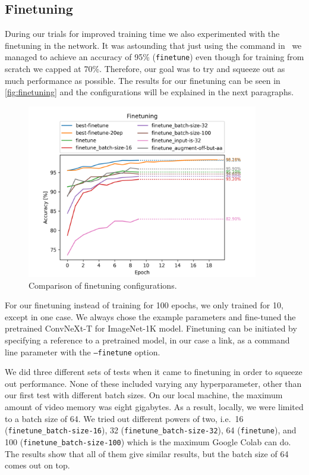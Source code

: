 \documentclass{article}
\begin{document}
\subsection{Finetuning}\label{subsec:finetuning}
During our trials for improved training time we also experimented with the finetuning in the network.
It was astounding that just using the command in~\cite{ayush0finetune} we managed to achieve an accuracy of 95\% (\texttt{finetune}) even though for training from scratch we capped at 70\%.
Therefore, our goal was to try and squeeze out as much performance as possible.
The results for our finetuning can be seen in \autoref{fig:finetuning} and the configurations will be explained in the next paragraphs.
\begin{figure}[h]
    \centering
    \includegraphics[width=0.9\textwidth]{images/finetuning}
    \caption{Comparison of finetuning configurations.}
    \label{fig:finetuning}
\end{figure}

For our finetuning instead of training for 100 epochs, we only trained for 10, except in one case.
We always chose the example parameters and fine-tuned the pretrained ConvNeXt-T for ImageNet-1K model\cite{repository}.
Finetuning can be initiated by specifying a reference to a pretrained model, in our case a link, as a command line parameter with the \texttt{--finetune} option.

We did three different sets of tests when it came to finetuning in order to squeeze out performance.
None of these included varying any hyperparameter, other than our first test with different batch sizes.
On our local machine, the maximum amount of video memory was eight gigabytes.
As a result, locally, we were limited to a batch size of 64.
We tried out different powers of two, i.e.\ 16 (\texttt{finetune\_batch-size-16}), 32 (\texttt{finetune\_batch-size-32}), 64 (\texttt{finetune}), and 100 (\texttt{finetune\_batch-size-100}) which is the maximum Google Colab can do.
The results show that all of them give similar results, but the batch size of 64 comes out on top.
\end{document}
